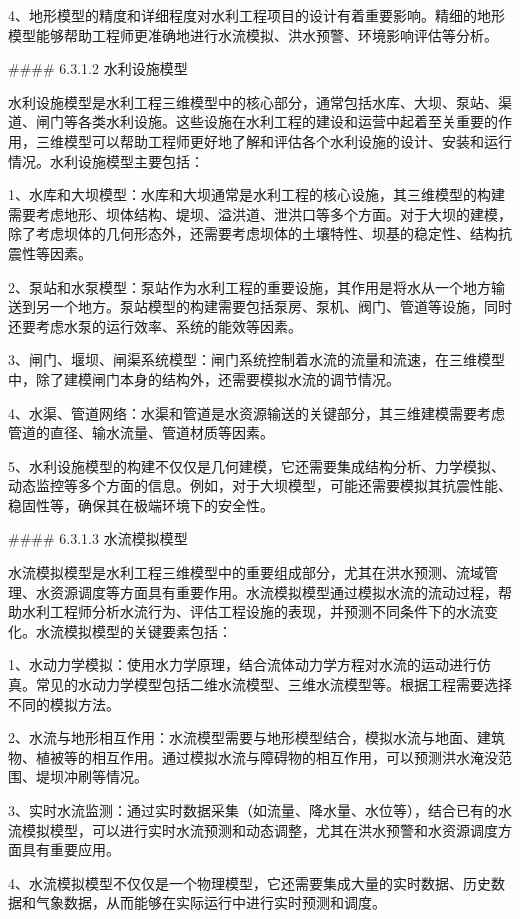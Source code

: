 4、地形模型的精度和详细程度对水利工程项目的设计有着重要影响。精细的地形模型能够帮助工程师更准确地进行水流模拟、洪水预警、环境影响评估等分析。

\#\#\#\# 6.3.1.2 水利设施模型

水利设施模型是水利工程三维模型中的核心部分，通常包括水库、大坝、泵站、渠道、闸门等各类水利设施。这些设施在水利工程的建设和运营中起着至关重要的作用，三维模型可以帮助工程师更好地了解和评估各个水利设施的设计、安装和运行情况。水利设施模型主要包括：

1、水库和大坝模型：水库和大坝通常是水利工程的核心设施，其三维模型的构建需要考虑地形、坝体结构、堤坝、溢洪道、泄洪口等多个方面。对于大坝的建模，除了考虑坝体的几何形态外，还需要考虑坝体的土壤特性、坝基的稳定性、结构抗震性等因素。

2、泵站和水泵模型：泵站作为水利工程的重要设施，其作用是将水从一个地方输送到另一个地方。泵站模型的构建需要包括泵房、泵机、阀门、管道等设施，同时还要考虑水泵的运行效率、系统的能效等因素。

3、闸门、堰坝、闸渠系统模型：闸门系统控制着水流的流量和流速，在三维模型中，除了建模闸门本身的结构外，还需要模拟水流的调节情况。

4、水渠、管道网络：水渠和管道是水资源输送的关键部分，其三维建模需要考虑管道的直径、输水流量、管道材质等因素。

5、水利设施模型的构建不仅仅是几何建模，它还需要集成结构分析、力学模拟、动态监控等多个方面的信息。例如，对于大坝模型，可能还需要模拟其抗震性能、稳固性等，确保其在极端环境下的安全性。

\#\#\#\# 6.3.1.3 水流模拟模型

水流模拟模型是水利工程三维模型中的重要组成部分，尤其在洪水预测、流域管理、水资源调度等方面具有重要作用。水流模拟模型通过模拟水流的流动过程，帮助水利工程师分析水流行为、评估工程设施的表现，并预测不同条件下的水流变化。水流模拟模型的关键要素包括：

1、水动力学模拟：使用水力学原理，结合流体动力学方程对水流的运动进行仿真。常见的水动力学模型包括二维水流模型、三维水流模型等。根据工程需要选择不同的模拟方法。

2、水流与地形相互作用：水流模型需要与地形模型结合，模拟水流与地面、建筑物、植被等的相互作用。通过模拟水流与障碍物的相互作用，可以预测洪水淹没范围、堤坝冲刷等情况。

3、实时水流监测：通过实时数据采集（如流量、降水量、水位等），结合已有的水流模拟模型，可以进行实时水流预测和动态调整，尤其在洪水预警和水资源调度方面具有重要应用。

4、水流模拟模型不仅仅是一个物理模型，它还需要集成大量的实时数据、历史数据和气象数据，从而能够在实际运行中进行实时预测和调度。

